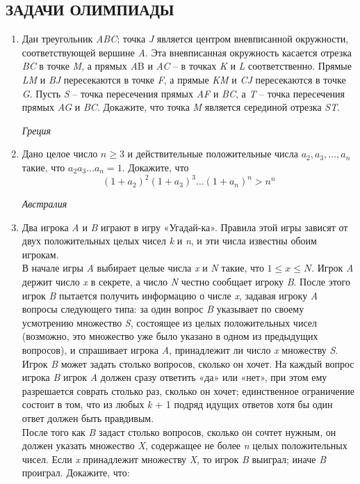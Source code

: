 \begin{multicols}{2}
    \subsection*{\centering\scriptsize ЗАДАЧИ ОЛИМПИАДЫ}
    \begin{enumerate}
        \item Дан треугольник \textit{ABC}; точка \textit{J} является центром вневписанной окружности, соответствующей вершине \textit{A}. Эта вневписанная окружность касается отрезка \textit{BC} в точке \textit{M}, а прямых \textit{A}B и \textit{AC} – в точках \textit{K} и \textit{L} соответственно. Прямые \textit{LM} и \textit{BJ} пересекаются в точке \textit{F}, а прямые \textit{KM} и \textit{CJ} пересекаются в точке \textit{G}. Пусть \textit{S} – точка пересечения прямых \textit{AF} и \textit{BC}, а \textit{T} – точка пересечения прямых \textit{AG} и \textit{BC}. Докажите, что точка \textit{M} является серединой отрезка \textit{ST}. \par\hfill \textit{Греция}
        \item Дано целое число $\textit{n} \geq 3$ и действительные положительные числа $a_2, a_3, \dots, a_n$ такие, что $a_2 a_3 \dots a_n = 1$. Докажите, что
            \begin{equation*}
                    (1 + a_2)^2 (1 + a_3)^3 \dots (1 + a_n)^n > n^n
            \end{equation*}
                \par\hfill \textit{Австралия}
        \item Два игрока \textit{A} и \textit{B} играют в игру «Угадай-ка». Правила этой игры зависят от двух положительных целых чисел \textit{k} и \textit{n}, и эти числа известны обоим игрокам. \\ В начале игры \textit{A} выбирает целые числа \textit{x} и \textit{N} такие, что $1 \leq x \leq N$. Игрок \textit{A} держит число \textit{x} в секрете, а число \textit{N} честно сообщает игроку \textit{B}. После этого игрок \textit{B} пытается получить информацию о числе \textit{x}, задавая игроку \textit{A} вопросы следующего типа: за один вопрос \textit{B} указывает по своему
    \columnbreak
        усмотрению множество \textit{S}, состоящее из целых положительных чисел (возможно, это множество уже было указано в одном из предыдущих вопросов), и спрашивает игрока \textit{A}, принадлежит ли число \textit{x} множеству \textit{S}. Игрок \textit{B} может задать столько вопросов, сколько он хочет. На каждый вопрос игрока \textit{B} игрок \textit{A} должен сразу ответить «да» или «нет», при этом ему разрешается соврать столько раз, сколько он хочет; единственное ограничение состоит в том, что из любых \textit{k} + 1 подряд идущих ответов хотя бы один ответ должен быть правдивым. \\ После того как \textit{B} задаст столько вопросов, сколько он сочтет нужным, он должен указать множество \textit{X}, содержащее не более \textit{n} целых положительных чисел. Если \textit{x} принадлежит множеству \textit{X}, то игрок \textit{B} выиграл; иначе \textit{B} проиграл. Докажите, что:

\end{enumerate}
\end{multicols}
